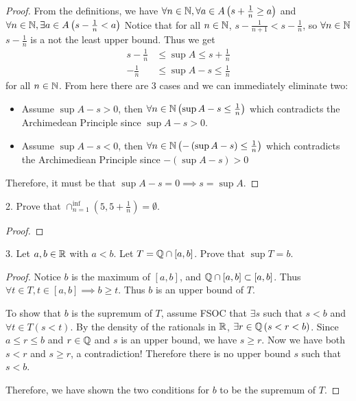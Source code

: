 
\begin{proof}
	From the definitions, we have $\forall n \in \mathbb{N}, \forall a \in A \left(s + \frac{1}{n} \ge a \right)$ and $\forall n \in \mathbb{N}, \exists a \in A\left( s - \frac{1}{n} < a \right) $ Notice that for all $n \in \mathbb{N}$, $s - \frac{1}{n + 1} < s - \frac{1}{n}$, so $\forall n \in \mathbb{N}$ $s - \frac{1}{n}$ is a not the least upper bound. Thus we get 
	\begin{align}
		s - \frac{1}{n} &\le \sup A \le s + \frac{1}{n} \\
		- \frac{1}{n}   &\le \sup A - s \le \frac{1}{n}
	\end{align} 
	for all $n \in \mathbb{N}$. From here there are 3 cases and we can immediately eliminate two:
	\begin{itemize}
		\item Assume $\sup A - s > 0$, then $\forall n \in \mathbb{N} \left( \sup A - s \le \frac{1}{n} \right) $ which contradicts the Archimedean Principle since $\sup A - s > 0$.
		\item Assume $\sup A - s < 0$, then $\forall n \in \mathbb{N} \left( -\left( \sup A - s \right)  \le \frac{1}{n} \right) $ which contradicts the Archimediean Principle since $-\left( \sup A - s \right) > 0 $
	\end{itemize}

	Therefore, it must be that $\sup A - s = 0  \implies s = \sup A$.
\end{proof}



2. Prove that $\cap_{n=1}^{\inf}\left( 5, 5+\frac{1}{n} \right) = \emptyset$.

\begin{proof}
	
\end{proof}




3. Let $a, b \in \mathbb{R}$ with $a < b$. Let $T = \mathbb{Q} \cap [a, b]$. Prove that $\sup T = b$.

\begin{proof}
	Notice $b$ is the maximum of $[a, b]$, and $\mathbb{Q} \cap [a, b] \subset [a, b]$. Thus $\forall t \in T, t \in [a, b] \implies b \ge t$. Thus $b$ is an upper bound of $T$.

	To show that $b$ is the supremum of $T$, assume FSOC that $\exists s$ such that $s < b$ and $\forall t \in T \left(s < t \right)$. By the density of the rationals in $ \mathbb{R}$, $\exists r \in \mathbb{Q} \left( s < r < b \right)$. Since $a \le r \le b$ and $r \in \mathbb{Q}$ and $s$ is an upper bound, we have $s \ge r$. Now we have both $s < r$ and $s \ge r$, a contradiction! Therefore there is no upper bound $s$ such that $s < b$. 

	Therefore, we have shown the two conditions for $b$ to be the supremum of $T$. 
\end{proof}




